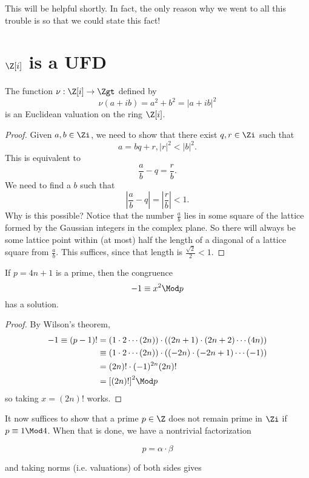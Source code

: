 \documentclass{scrbook}
\begin{document}
This will be helpful shortly. In fact, the only reason why we went to all this
trouble is so that we could state this fact!

\section{$\Z[i]$ is a UFD} 
\begin{thm}
  The function $\nu: \Z[i]\to\Zgt$ defined by
  $$\nu(a + ib) = a^2+b^2 = |a+ib|^2$$
  is an Euclidean valuation on the ring $\Z[i]$.
\end{thm}

\begin{proof}
  Given $a,b\in\Zi$, we need to show that there exist $q,r\in\Zi$ such that
  $$a=bq+r, |r|^2 < |b|^2.$$ This is equivalent to
  $$\frac ab - q = \frac r b.$$ We need to find a $b$ such that
  $$\left| \frac ab - q\right| = \left| \frac rb\right|< 1.$$
  Why is this possible? Notice that the number $\frac ab$ lies in some square
  of the lattice formed by the Gaussian integers in the complex plane. So there
  will always be some lattice point within (at most) half the length of a
  diagonal of a lattice square from $\frac ab$. This suffices, since that length
  is $\frac{\sqrt 2}2 < 1$.
\end{proof}

\begin{lem}
  If $p=4n+1$ is a prime, then the congruence
  $$-1\equiv x^2\Mod p$$
  has a solution.
\end{lem}
\begin{proof}
  By Wilson's theorem,
  \begin{align}
    -1\equiv (p-1)! &= (1\cdot2\cdots{(2n)})\cdot((2n+1)\cdot(2n+2)\cdots{(4n)}) \\
                    &\equiv (1\cdot2\cdots{(2n)})\cdot((-2n)\cdot(-2n+1)\cdots{(-1)}) \\
                    &= (2n)!\cdot{(-1)^{2n}(2n)!} \\
                    &= {[(2n)!]}^2 \Mod p
  \end{align} 
  so taking $x=(2n)!$ works.
\end{proof}

It now suffices to show that a prime $p\in\Z$ does not remain prime in $\Zi$ if
$p\equiv 1\Mod 4$.
When that is done, we have a nontrivial factorization

$$p=\alpha\cdot\beta$$

and taking norms (i.e. valuations) of both sides gives
\end{document}
